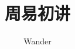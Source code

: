 \documentclass[12pt,oneside]{book}
\begin{document}
\title{周易初讲}
\author{Wander}

\makemytitle
\end{document}

